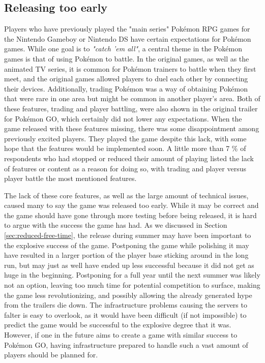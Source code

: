 \subsection{Releasing too early}
Players who have previously played the "main series" Pokémon RPG games for the Nintendo Gameboy or Nintendo DS have certain expectations for Pokémon games. While one goal is to \emph{"catch 'em all"}, a central theme in the Pokémon games is that of using Pokémon to battle. In the original games, as well as the animated TV series, it is common for Pokémon trainers to battle when they first meet, and the original games allowed players to duel each other by connecting their devices. Additionally, trading Pokémon was a way of obtaining Pokémon that were rare in one area but might be common in another player's area. Both of these features, trading and player battling, were also shown in the original trailer for Pokémon GO, which certainly did not lower any expectations. When the game released with these features missing, there was some disappointment among previously excited players. They played the game despite this lack, with some hope that the features would be implemented soon. A little more than 7 \% of respondents who had stopped or reduced their amount of playing listed the lack of features or content as a reason for doing so, with trading and player versus player battle the most mentioned features.

The lack of these core features, as well as the large amount of technical issues, caused many to say the game was released too early. While it may be correct and the game should have gone through more testing before being released, it is hard to argue with the success the game has had. As we discussed in Section \ref{sec:reduced-free-time}, the release during summer may have been important to the explosive success of the game. Postponing the game while polishing it may have resulted in a larger portion of the player base sticking around in the long run, but may just as well have ended up less successful because it did not get as huge in the beginning. Postponing for a full year until the next summer was likely not an option, leaving too much time for potential competition to surface, making the game less revolutionizing, and possibly allowing the already generated hype from the trailers die down. The infrastructure problems causing the servers to falter is easy to overlook, as it would have been difficult (if not impossible) to predict the game would be successful to the explosive degree that it was. However, if one in the future aims to create a game with similar success to Pokémon GO, having infrastructure prepared to handle such a vast amount of players should be planned for.

